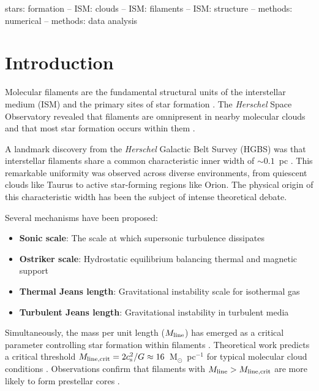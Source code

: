 \documentclass{mnras}
\begin{document}
\begin{keywords}
stars: formation -- ISM: clouds -- ISM: filaments -- ISM: structure -- methods: numerical -- methods: data analysis
\end{keywords}

\section{Introduction}
\label{sec:intro}

Molecular filaments are the fundamental structural units of the interstellar medium (ISM) and the primary sites of star formation \citep{Andre2010, Andre2014}. The \textit{Herschel} Space Observatory revealed that filaments are omnipresent in nearby molecular clouds \citep{Molineiri2010} and that most star formation occurs within them \citep{Andre2014}.

A landmark discovery from the \textit{Herschel} Galactic Belt Survey (HGBS) was that interstellar filaments share a common characteristic inner width of $\sim 0.1$~pc \citep{Arzoumanian2011, Arzoumanian2019}. This remarkable uniformity was observed across diverse environments, from quiescent clouds like Taurus to active star-forming regions like Orion. The physical origin of this characteristic width has been the subject of intense theoretical debate.

Several mechanisms have been proposed:
\begin{itemize}
  \item \textbf{Sonic scale}: The scale at which supersonic turbulence dissipates \citep{Vazquez2003}
  \item \textbf{Ostriker scale}: Hydrostatic equilibrium balancing thermal and magnetic support \citep{Ostriker1964}
  \item \textbf{Thermal Jeans length}: Gravitational instability scale for isothermal gas \citep{Inutsuka1997}
  \item \textbf{Turbulent Jeans length}: Gravitational instability in turbulent media
\end{itemize}

Simultaneously, the mass per unit length ($M_{\rm line}$) has emerged as a critical parameter controlling star formation within filaments \citep{Andre2014, Inutsuka1997}. Theoretical work predicts a critical threshold $M_{\rm line,crit} = 2c_{\rm s}^2/G \approx 16$~M$_\odot$~pc$^{-1}$ for typical molecular cloud conditions \citep{Ostriker1964}. Observations confirm that filaments with $M_{\rm line} > M_{\rm line,crit}$ are more likely to form prestellar cores \citep{Andre2014}.
\end{document}
